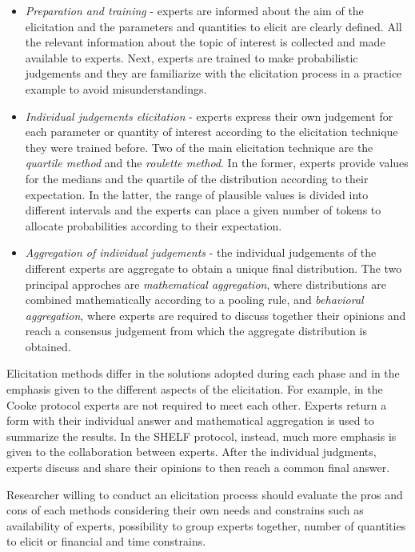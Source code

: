 \documentclass[graybox]{svmult}
\begin{document}
\begin{itemize}
	\item{\emph{Preparation and training} - experts are informed about  the aim of the elicitation and the parameters and quantities to elicit are clearly defined. All the relevant information about the topic of interest is collected and made available to experts. Next, experts are trained to make probabilistic judgements and they are familiarize with the elicitation process in a practice example to avoid misunderstandings. }
	\item{\emph{Individual judgements elicitation} - experts express their own judgement for each parameter or quantity of interest according to the elicitation technique they were trained before. Two of the main elicitation technique are the \emph{quartile method} and the \emph{roulette method}. In the former, experts provide values for the medians  and the quartile of the distribution according to their expectation. In the latter, the range of plausible values is divided into different intervals and the experts can place a given number of tokens to allocate probabilities according to  their expectation.}
	\item{\emph{Aggregation of individual judgements} - the individual judgements of the different experts are aggregate to obtain a unique final distribution. The two principal approches are \emph{mathematical  aggregation}, where distributions are combined mathematically according to a pooling rule, and \emph{behavioral aggregation}, where experts are required to discuss together their opinions and reach a consensus judgement from which the aggregate distribution is obtained.}
\end{itemize}

Elicitation methods differ in the solutions adopted during each phase and in the emphasis given to the different aspects of the elicitation. For example, in the Cooke protocol experts are not required to meet each other. Experts return a form with their individual answer and mathematical aggregation is used to summarize the results. In the SHELF protocol, instead, much more emphasis is given to the collaboration between experts. After the  individual judgments, experts discuss and share their opinions to then reach a common final answer.

Researcher willing to conduct an elicitation process should evaluate the pros and cons of each methods considering their own needs and constrains such as availability of experts, possibility to group experts together, number of quantities to elicit or financial and time constrains.
\end{document}
